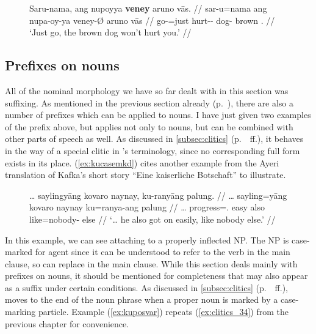 \begin{figure}[h]
\ex\label{ex:topzeromkd}
\begingl
	\gla Saru-nama, ang nupoyya \textbf{veney} aruno vās. //
	\glb sar-u=nama ang nupa-oy-ya veney-Ø aruno vās //
	\glc go-\Imp{}=just \AgtT{} hurt-\Neg{}-\TsgM{} dog-\Top{} brown 
		\Second{}.\Parg{} //
	\glft `Just go, the brown dog won't hurt you.' //
\endgl\xe
\end{figure}


\subsection{Prefixes on nouns}
\label{subsec:nounpref}

All of the nominal morphology we have so far dealt with in this section was
suffixing. As mentioned in the previous section already
(p.~\pageref{nounprefixes}), there are also a number of prefixes which can be
applied to nouns. I have just given two examples of the prefix
 above, but  applies not only
to nouns, but can be combined with other parts of speech as well. As discussed
in \autoref{subsec:clitics} (p.~\pageref{clitics_prenoun_ku}~ff.), it behaves
in the way of a special clitic in \citet{zwicky1977}'s terminology, since no
corresponding full form exists in its place. (\ref{ex:kucasemkd}) cites another
example from the Ayeri translation of Kafka's short story \enquote{Eine
kaiserliche Botschaft} to illustrate.

\begin{figure}[h]
\ex\label{ex:kucasemkd}
\label{ex:kukafka2}\begingl
	\gla … saylingyāng kovaro naynay, ku-ranyāng palung. //
	\glb … sayling=yāng kovaro naynay ku=ranya-ang palung //
	\glc … progress=\TsgM{}.\Aarg{} easy also like=nobody-\Aarg{} else //
	\glft `… he also got on easily, like nobody else.'%
	//
\endgl\xe
\end{figure}

In this example, we can see  attaching to a properly inflected
NP. The NP  is case-marked for
agent since it can be understood to refer to the verb
 in the main clause, so  can replace  in the
main clause. While this section deals mainly with prefixes on nouns, it should
be mentioned for completeness that  may also appear as a suffix
under certain conditions. As discussed in \autoref{subsec:clitics}
(p.~\pageref{clitics_prenoun_ku}~ff.),  moves to the end of the
noun phrase when a proper noun is marked by a case-marking particle. Example
(\ref{ex:kuposvar}) repeats (\ref{ex:clitics_34}) from the previous chapter for
convenience.

